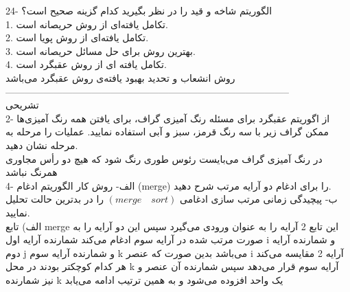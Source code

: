 \documentclass[10pt,a4paper]{article}
\begin{document}
24- الگوریتم شاخه و قید را در نظر بگیرید کدام گزینه صحیح است؟\\
1. تکامل یافته‌ای از روش حریصانه است.\\
2. تکامل یافته‌ای از روش پویا است.\\
3. بهترین روش برای حل مسائل حریصانه است.\\
4. تکامل یافته ای از روش عقبگرد است.\\

روش انشعاب و تحدید بهبود یافته‌ی روش عقبگرد می‌باشد\\

-----------------------------------------------------------------------------------------\\
تشریحی\\

2- از اگوریتم عقبگرد برای مسئله رنگ آمیزی گراف، برای یافتن همه رنگ آمیزی‌ها ممکن گراف زیر با سه رنگ قرمز، سبز و آبی استفاده نمایید. عملیات را مرحله به مرحله نشان دهید.\\

در رنگ آمیزی گراف می‌بایست رئوس طوری رنگ شود که هیچ دو رأس مجاوری همرنگ نباشد\\

4- الف- روش کار الگوریتم ادغام (merge) را برای ادغام دو آرایه مرتب شرح دهید.\\
ب- پیچیدگی زمانی مرتب سازی ادغامی $(merge\quad sort)$ را در بدترین حالت تحلیل نمایید.\\

الف) تابع merge این تابع 2 آرایه را به عنوان ورودی می‌گیرد سپس این دو آرایه را به صورت مرتب شده در آرایه سوم ادغام می‌کند شمارنده آرایه اول i و شمارنده آرایه دوم j و شمارنده آرایه سوم k می‌باشد بدین صورت که عنصر i آرایه 2 مقایسه می‌کند هر کدام کوچکتر بودند در محل k آرایه سوم قرار می‌دهد سپس شمارنده آن عنصر و نیز شمارنده k یک واحد افزوده می‌شود و به همین ترتیب ادامه می‌یابد\\
\end{document}

